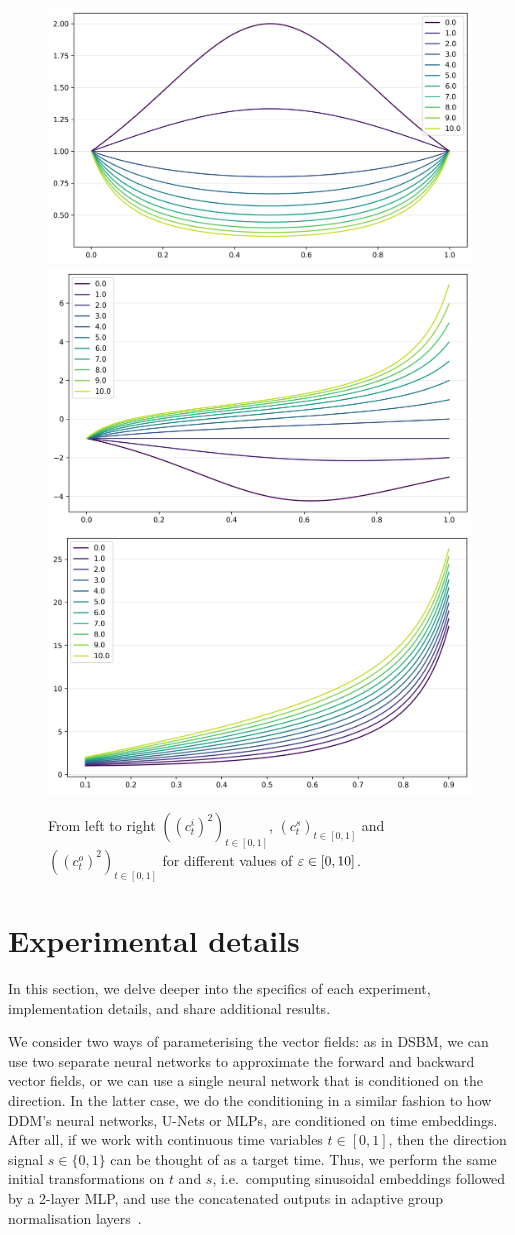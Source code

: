 \documentclass{article}
\begin{document}
\begin{figure}
    \centering
    \includegraphics[width=.31\linewidth]{img/ci_bridge.png} \hfill
    \includegraphics[width=.31\linewidth]{img/cs_bridge.png} \hfill
    \includegraphics[width=.31\linewidth]{img/co_sq_bridge.png}
    \caption{From left to right $((c_t^i)^2)_{t \in [0,1]}$, $(c_t^s)_{t \in [0,1]}$ and $((c_t^o)^2)_{t \in [0,1]}$ for different values of $\varepsilon \in [0, 10]$.}
    \label{fig:my_label}
\end{figure}


\section{Experimental details}
\label{sec:experimental_details}

In this section, we delve deeper into the specifics of each experiment, implementation details,  and share additional results.

We consider two ways of parameterising the vector fields: as in DSBM, we can use two separate neural networks to approximate the forward and backward vector fields, or we can use a single neural network that is conditioned on the direction. In the latter case, we do the conditioning in a similar fashion to how DDM's neural networks, U-Nets or MLPs, are conditioned on time embeddings. After all, if we work with continuous time variables $t \in [0, 1]$, then the direction signal $s \in \{0, 1\}$ can be thought of as a target time. Thus, we perform the same initial transformations on $t$ and $s$, i.e.~computing sinusoidal embeddings followed by a 2-layer MLP, and use the concatenated outputs in adaptive group normalisation layers~\citep{dhariwal2021diffusion, hudson2023soda, perez2018film}.          
\end{document}
